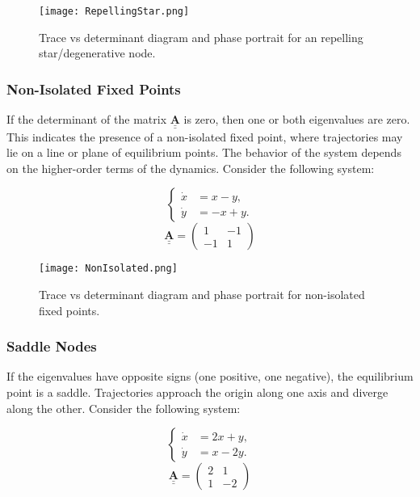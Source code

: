\documentclass{amsbook}
\begin{document}
\begin{figure}[H]
    \centering
    \texttt{[image: RepellingStar.png]}
    \caption{Trace vs determinant diagram and phase portrait for an repelling star/degenerative node.}
    \label{fig:RepellingStar}
\end{figure}

\subsubsection{\textbf{Non-Isolated Fixed Points}}
If the determinant of the matrix \(\underline{\underline{\mathbf{A}}}\) is zero, then one or both eigenvalues are zero. This indicates the presence of a non-isolated fixed point, where trajectories may lie on a line or plane of equilibrium points. The behavior of the system depends on the higher-order terms of the dynamics. Consider the following system:

$$
\begin{cases}
\dot{x} &= x - y, \\
\dot{y} &= -x + y.
\end{cases}
$$
$$
\underline{\underline{\mathbf{A}}} = \begin{pmatrix} 1 & -1 \\ -1 & 1 \end{pmatrix}
$$

\begin{figure}[H]
    \centering
    \texttt{[image: NonIsolated.png]}
    \caption{Trace vs determinant diagram and phase portrait for non-isolated fixed points.}
    \label{fig:NonIsolated}
\end{figure}

\subsubsection{\textbf{Saddle Nodes}}
If the eigenvalues have opposite signs (one positive, one negative), the equilibrium point is a saddle. Trajectories approach the origin along one axis and diverge along the other. Consider the following system:

$$
\begin{cases}
\dot{x} &= 2x + y, \\
\dot{y} &= x - 2y.
\end{cases}
$$
$$
\underline{\underline{\mathbf{A}}} = \begin{pmatrix} 2 & 1 \\ 1 & -2 \end{pmatrix}
$$
\end{document}
